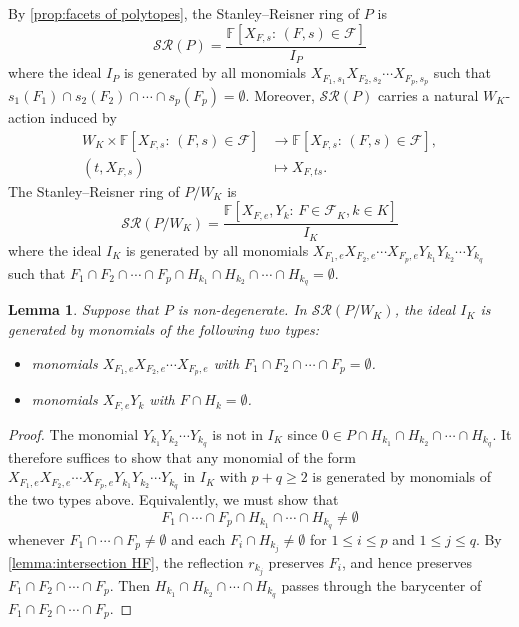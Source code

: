 \documentclass{amsart}
\theoremstyle{plain} \numberwithin{equation}{section}
\newtheorem{lemma}[theorem]{Lemma}
\theoremstyle{definition}
\newcommand{\F}{\mathbb{F}}
\begin{document}
 By \cref{prop:facets of polytopes}, the Stanley--Reisner ring of $P$ is 
    $$\mathcal{SR}(P)=\frac{\F[X_{F,s}:\, (F,s)\in \mathcal{F}]}{I_P}$$
    where the ideal $I_P$ is generated by all  monomials $X_{F_1,s_1}X_{F_2,s_2}\cdots X_{F_p,s_p}$ such that $s_{1}(F_{1})\cap s_{2}(F_{2})\cap\cdots\cap s_{p}(F_{p})=\emptyset$. Moreover, $\mathcal{SR}(P)$ carries a natural $W_K$-action induced by
\begin{align}
  W_K\times \F[X_{F,s}:\, (F,s)\in \mathcal{F}] &\to \F[X_{F,s}:\, (F,s)\in \mathcal{F}],\label{eq:W-action}\\
  \left(t,X_{F,s}\right)&\mapsto X_{F,ts}.\nonumber 
\end{align}
The Stanley--Reisner ring of $P/W_K$ is 
$$\mathcal{SR}(P/W_K)=\frac{\F[X_{F,e}, Y_k:\, F\in\mathcal{F}_K, k\in K]}{I_K}$$
where the ideal $I_K$ is generated by all  monomials $X_{F_1,e}X_{F_2,e}\cdots X_{F_p,e}Y_{k_1}Y_{k_2}\cdots Y_{k_q}$ such that $F_{1}\cap F_{2}\cap\cdots\cap F_{p}\cap H_{k_1}\cap H_{k_2}\cap\cdots\cap H_{k_q}=\emptyset$.




\begin{lemma}\label{lem:I_K generators}
  Suppose that $P$ is non-degenerate. In $\mathcal{SR}(P/W_K)$, the ideal $I_K$ is generated by monomials of the following two types:
  \begin{itemize}
    \item monomials $X_{F_1,e}X_{F_2,e}\cdots X_{F_p,e}$ with $F_{1}\cap F_{2}\cap\cdots\cap F_{p}=\emptyset$.
    \item monomials $X_{F,e}Y_k$ with $F\cap H_k=\emptyset$.
  \end{itemize}
\end{lemma}
  \begin{proof}
    The monomial $Y_{k_1}Y_{k_2}\cdots Y_{k_q}$ is not in $I_K$ since $0\in P\cap H_{k_1}\cap H_{k_2}\cap\cdots\cap H_{k_q}$. 
    It therefore suffices to show that any monomial of the form
     $X_{F_1,e}X_{F_2,e}\cdots X_{F_p,e}Y_{k_1}Y_{k_2}\cdots Y_{k_q}$ in $I_K$ with $p+q \ge 2$ is generated by monomials of the two types above.
     Equivalently, we must show that
$$
F_1 \cap \cdots \cap F_p
\cap H_{k_1} \cap \cdots \cap H_{k_q}
\neq \emptyset
$$
whenever $F_1 \cap \cdots \cap F_p \neq \emptyset$ and each $F_{i}\cap H_{k_j}\ne\emptyset$ for $1\leq i\leq p$ and $1\leq j\leq q$.
By \cref{lemma:intersection HF}, the reflection $r_{k_j}$  preserves $F_{i}$, and hence preserves $F_{1}\cap F_{2}\cap\cdots\cap F_{p}$. Then $H_{k_1}\cap H_{k_2}\cap\cdots\cap H_{k_q}$ passes through the barycenter of $F_{1}\cap F_{2}\cap\cdots\cap F_{p}$.
\qedhere
  \end{proof}
\end{document}
